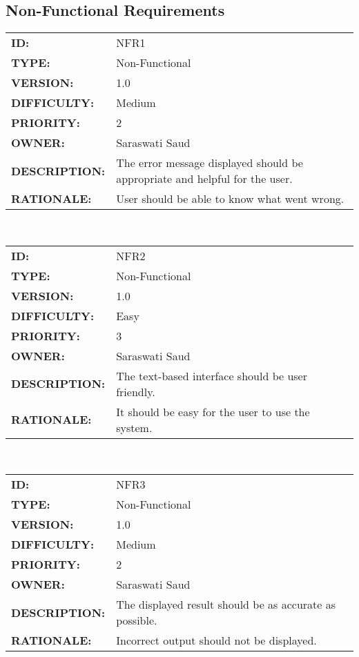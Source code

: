        \subsection{Non-Functional Requirements}
        \begin{tabular}{ |p{4cm} | p{11cm}| }
            \hline
            \textbf{ID:} & NFR1\\
            \textbf{TYPE:} & Non-Functional\\
            \textbf{VERSION:} & 1.0\\
            \textbf{DIFFICULTY:} & Medium\\
            \textbf{PRIORITY:} & 2\\
            \textbf{OWNER:} & Saraswati Saud\\
            \textbf{DESCRIPTION:} & The error message displayed should be appropriate and helpful for the user. \\
            \textbf{RATIONALE:} & User should be able to know what went wrong. \\
            \hline
        \end{tabular}
        \\[10pt]
        \begin{tabular}{ |p{4cm} | p{11cm}| }
            \hline
            \textbf{ID:} & NFR2\\
            \textbf{TYPE:} & Non-Functional\\
            \textbf{VERSION:} & 1.0\\
            \textbf{DIFFICULTY:} & Easy\\
            \textbf{PRIORITY:} & 3\\
            \textbf{OWNER:} & Saraswati Saud\\
            \textbf{DESCRIPTION:} & The text-based interface should be user friendly. \\
            \textbf{RATIONALE:} & It should be easy for the user to use the system. \\
            \hline
        \end{tabular}
        \\[10pt]
        \begin{tabular}{ |p{4cm} | p{11cm}| }
            \hline
            \textbf{ID:} & NFR3\\
            \textbf{TYPE:} & Non-Functional\\
            \textbf{VERSION:} & 1.0\\
            \textbf{DIFFICULTY:} & Medium\\
            \textbf{PRIORITY:} & 2\\
            \textbf{OWNER:} & Saraswati Saud\\
            \textbf{DESCRIPTION:} & The displayed result should be as accurate as possible. \\
            \textbf{RATIONALE:} & Incorrect output should not be displayed. \\
            \hline
        \end{tabular}
